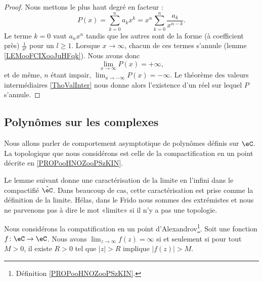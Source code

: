 \begin{proof}
    Nous mettons le plus haut degré en facteur :
    \begin{equation}
        P(x)=\sum_{k=0}^na_kx^k=x^n\sum_{k=0}^n\frac{ a_k }{ x^{n-k} }.
    \end{equation}
    Le terme \( k=0\) vaut \( a_nx^n\) tandis que les autres sont de la forme (à coefficient près) \( \frac{1}{ x^l }\) pour un \( l\geq 1\). Lorsque \( x\to \infty\), chacun de ces termes s'annule (lemme \ref{LEMooFCIXooJuHFqk}). Nous avons donc
    \begin{equation}
        \lim_{x\to \infty} P(x)=+\infty,
    \end{equation}
    et de même, \( n\) étant impair, \( \lim_{x\to -\infty} P(x)=-\infty\). Le théorème des valeurs intermédiaires \ref{ThoValInter} nous donne alors l'existence d'un réel sur lequel \( P\) s'annule.
\end{proof}

\subsection{Polynômes sur les complexes}

Nous allons parler de comportement asymptotique de polynômes définis sur \( \eC\). La topologique que nous considérons est celle de la compactification en un point décrite en \ref{PROPooHNOZooPSzKIN}.

Le lemme suivant donne une caractérisation de la limite en l'infini dans le compactifié \( \hat \eC\). Dans beaucoup de cas, cette caractérisation est prise comme la définition de la limite. Hélas, dans le Frido nous sommes des extrémistes et nous ne parvenons pas à dire le mot «limite» si il n'y a pas une topologie.
\begin{lemma}        \label{LEMooERABooQjLBzW}
    Nous considérons la compatification en un point d'Alexandrov\footnote{Définition \ref{PROPooHNOZooPSzKIN}.}. Soit une fonction \( f\colon \eC\to \eC\). Nous avons \( \lim_{z\to \infty} f(z)=\infty\) si et seulement si pour tout \( M>0\), il existe \( R>0\) tel que \( | z |>R\) implique \( | f(z) |>M\).
\end{lemma}

